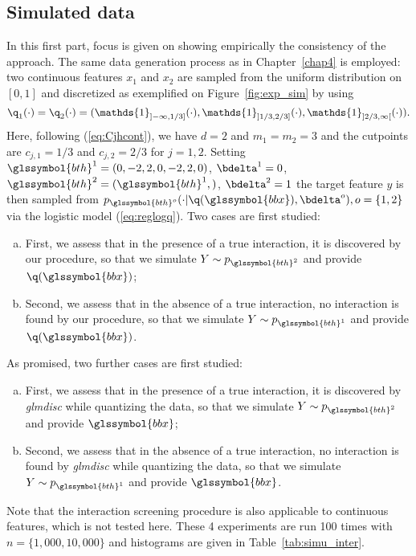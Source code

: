 \subsection{Simulated data}

In this first part, focus is given on showing empirically the consistency of the approach. The same data generation process as in Chapter~\ref{chap4} is employed: two continuous features $x_1$ and $x_2$ are sampled from the uniform distribution on $[0,1]$ and discretized as exemplified on Figure~\ref{fig:exp_sim} by using
\[\q_1(\cdot)=\q_2(\cdot) = (\mathds{1}_{]-\infty,1/3]}(\cdot),\mathds{1}_{]1/3,2/3]}(\cdot),\mathds{1}_{]2/3,\infty[}(\cdot)).\]
Here, following (\ref{eq:Cjhcont}), we have $d=2$ and $m_1=m_2=3$ and the cutpoints are $c_{j,1}=1/3$ and $c_{j,2}=2/3$ for $j=1,2$. Setting $\glssymbol{bth}^{1}=(0,-2,2,0,-2,2,0)$, $\bdelta^{1} = 0$, $\glssymbol{bth}^{2} = (\glssymbol{bth}^{1},)$, $\bdelta^{2} = 1$ the target feature $y$ is then sampled from $p_{\glssymbol{bth}^{o}}(\cdot | \q(\glssymbol{bbx}), \bdelta^{o}), o = \{1,2\}$ via the logistic model (\ref{eq:reglogq}). Two cases are first studied:
\begin{enumerate}[(a)]
    \item First, we assess that in the presence of a true interaction, it is discovered by our procedure, so that we simulate $Y \sim p_{\glssymbol{bth}^{2}}$ and provide $\q(\glssymbol{bbx})$;
    \item Second, we assess that in the absence of a true interaction, no interaction is found by our procedure, so that we simulate $Y \sim p_{\glssymbol{bth}^{1}}$ and provide $\q(\glssymbol{bbx})$.
\end{enumerate}
As promised, two further cases are first studied:
\begin{enumerate}[(a)]
    \item First, we assess that in the presence of a true interaction, it is discovered by \textit{glmdisc} while quantizing the data, so that we simulate $Y \sim p_{\glssymbol{bth}^{2}}$ and provide $\glssymbol{bbx}$;
    \item Second, we assess that in the absence of a true interaction, no interaction is found by \textit{glmdisc} while quantizing the data, so that we simulate $Y \sim p_{\glssymbol{bth}^{1}}$ and provide $\glssymbol{bbx}$.
\end{enumerate}
Note that the interaction screening procedure is also applicable to continuous features, which is not tested here. These 4 experiments are run 100 times with $n = \{1{,}000,10{,}000\}$ and histograms are given in Table~\ref{tab:simu_inter}.

